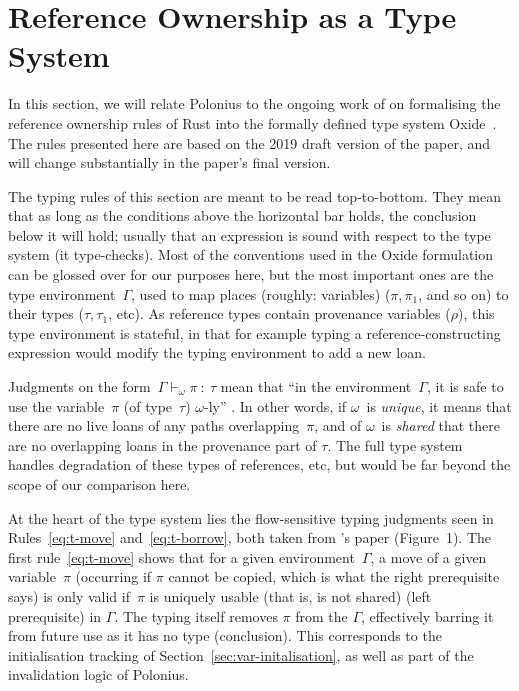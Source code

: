 \documentclass[11pt,a4paper,twoside,openany,draft]{report}
\begin{document}
\section{Reference Ownership as a Type System}\label{sec:type-system}

In this section, we will relate Polonius to the ongoing work of
\citeauthor*{weiss_oxide:_2019} on formalising the reference ownership rules of
Rust into the formally defined type system Oxide~\cite{weiss_oxide:_2019}. The
rules presented here are based on the 2019 draft version of the paper, and will
change substantially in the paper's final version.

The typing rules of this section are meant to be read top-to-bottom. They mean
that as long as the conditions above the horizontal bar holds, the conclusion
below it will hold; usually that an expression is sound with respect to the type
system (it type-checks). Most of the conventions used in the Oxide formulation
can be glossed over for our purposes here, but the most important ones are the
type environment~$\Gamma$, used to map places (roughly: variables) ($\pi,
\pi_1$, and so on) to their types ($\tau, \tau_1$, etc). As reference types
contain provenance variables ($\rho$), this type environment is stateful, in
that for example typing a reference-constructing expression would modify the
typing environment to add a new loan.

Judgments on the form~$\Gamma \vdash_{\omega} \pi \: : \: \tau$ mean that ``in
the environment~$\Gamma$, it is safe to use the variable~$\pi$ (of type~$\tau$)
$\omega$-ly'' \cite{weiss_oxide:_2019}. In other words, if $\omega$~is
\emph{unique}, it means that there are no live loans of any paths
overlapping~$\pi$, and of $\omega$~is \emph{shared} that there are no
overlapping loans in the provenance part of $\tau$. The full type system handles
degradation of these types of references, etc, but would be far beyond the scope
of our comparison here.

At the heart of the type system lies the flow-sensitive typing judgments seen in
Rules~\ref{eq:t-move} and~\ref{eq:t-borrow}, both taken from
\citeauthor*{weiss_oxide:_2019}'s paper (Figure~1). The first
rule~\eqref{eq:t-move} shows that for a given environment~$\Gamma$, a move of a
given variable~$\pi$ (occurring if $\pi$ cannot be copied, which is what the
right prerequisite says) is only valid if~$\pi$ is uniquely usable (that is, is
not shared) (left prerequisite) in $\Gamma$. The typing itself removes $\pi$
from the $\Gamma$, effectively barring it from future use as it has no type
(conclusion). This corresponds to the initialisation tracking of
Section~\ref{sec:var-initalisation}, as well as part of the invalidation logic
of Polonius.
\end{document}
